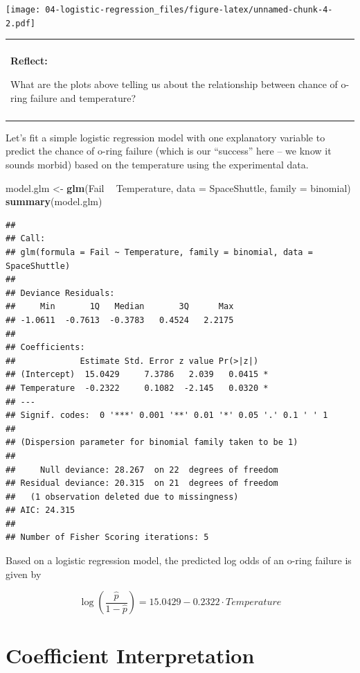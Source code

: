 \documentclass[
]{book}
\newenvironment{Shaded}{\begin{snugshade}}{\end{snugshade}}
\newcommand{\DataTypeTok}[1]{\textcolor[rgb]{0.13,0.29,0.53}{#1}}
\newcommand{\KeywordTok}[1]{\textcolor[rgb]{0.13,0.29,0.53}{\textbf{#1}}}
\newcommand{\NormalTok}[1]{#1}
\newcommand{\OperatorTok}[1]{\textcolor[rgb]{0.81,0.36,0.00}{\textbf{#1}}}
\newcommand{\StringTok}[1]{\textcolor[rgb]{0.31,0.60,0.02}{#1}}
\newenvironment{reflect}
{
    \begin{center}
    
    \begin{tabular}{|p{0.8\textwidth}|}
    \rowcolor{LightBlue}
    \hline\\
    \rowcolor{LightBlue}
    \textbf{Reflect:}
}
{
    \\\rowcolor{LightBlue}
    \\\hline
    \end{tabular} 
    \end{center}
}
\begin{document}
\texttt{[image: 04-logistic-regression\_files/figure-latex/unnamed-chunk-4-2.pdf]}

\begin{reflect}
What are the plots above telling us about the relationship between
chance of o-ring failure and temperature?
\end{reflect}

Let's fit a simple logistic regression model with one explanatory variable to predict the chance of o-ring failure (which is our ``success'' here -- we know it sounds morbid) based on the temperature using the experimental data.

\begin{Shaded}
\begin{Highlighting}[]
\NormalTok{model.glm <-}\StringTok{ }\KeywordTok{glm}\NormalTok{(Fail }\OperatorTok{~}\StringTok{ }\NormalTok{Temperature, }\DataTypeTok{data =}\NormalTok{ SpaceShuttle, }\DataTypeTok{family =}\NormalTok{ binomial)}
\KeywordTok{summary}\NormalTok{(model.glm)}
\end{Highlighting}
\end{Shaded}

\begin{verbatim}
## 
## Call:
## glm(formula = Fail ~ Temperature, family = binomial, data = SpaceShuttle)
## 
## Deviance Residuals: 
##     Min       1Q   Median       3Q      Max  
## -1.0611  -0.7613  -0.3783   0.4524   2.2175  
## 
## Coefficients:
##             Estimate Std. Error z value Pr(>|z|)  
## (Intercept)  15.0429     7.3786   2.039   0.0415 *
## Temperature  -0.2322     0.1082  -2.145   0.0320 *
## ---
## Signif. codes:  0 '***' 0.001 '**' 0.01 '*' 0.05 '.' 0.1 ' ' 1
## 
## (Dispersion parameter for binomial family taken to be 1)
## 
##     Null deviance: 28.267  on 22  degrees of freedom
## Residual deviance: 20.315  on 21  degrees of freedom
##   (1 observation deleted due to missingness)
## AIC: 24.315
## 
## Number of Fisher Scoring iterations: 5
\end{verbatim}

Based on a logistic regression model, the predicted log odds of an o-ring failure is given by

\[\log\left(\frac{\hat{p}}{1-\hat{p}}\right) = 15.0429 -0.2322\cdot Temperature\]

\hypertarget{coefficient-interpretation}{%
\section{Coefficient Interpretation}\label{coefficient-interpretation}}
\end{document}
